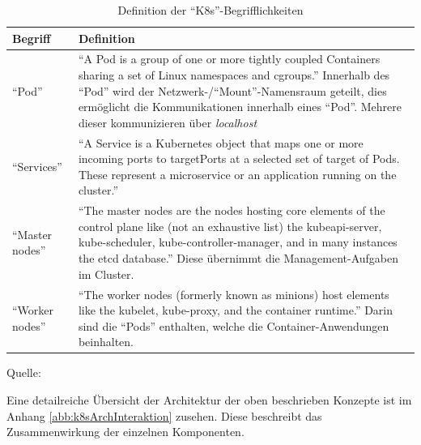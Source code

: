 \begin{table}[h!]
	\centering
	
	\begin{tabular}{@{}lp{12.0cm}@{}}\toprule[1.5pt]
		
		\textbf{Begriff} & \textbf{Definition}  \\ \midrule
		
		\enquote{Pod} & \enquote{A Pod is a group of one or more tightly coupled Containers sharing a set of Linux namespaces and cgroups.} Innerhalb des \enquote{Pod} wird der Netzwerk-/\enquote{Mount}-Namensraum geteilt, dies ermöglicht die Kommunikationen innerhalb eines \enquote{Pod}. Mehrere dieser kommunizieren über \textit{localhost} \\
		
		\enquote{Services} &  \enquote{A Service is a Kubernetes object that maps one or more incoming ports to targetPorts at a selected set of target of Pods. These represent a microservice or an application running on the cluster.} \\
		
		\enquote{Master nodes} & \enquote{The master nodes are the nodes hosting core elements of the control plane like (not an exhaustive list) the kubeapi-server, kube-scheduler, kube-controller-manager, and in many	instances the etcd database.} Diese übernimmt die Management-Aufgaben im Cluster. \\
		
		\enquote{Worker nodes} & \enquote{The worker nodes (formerly known as minions) host elements like the kubelet, kube-proxy, and the container runtime.} Darin sind die \enquote{Pods} enthalten, welche die Container-Anwendungen beinhalten. \\
		
		\bottomrule[1.5pt]
	\end{tabular}
	
	\caption{Definition der \enquote{\ac{K8s}}-Begrifflichkeiten}
	{\footnotesize{Quelle: \cite[][S.10-14]{caban_architecting_2019}}}
	\label{tab:definitionen}
	
\end{table}
Eine detailreiche Übersicht der Architektur der oben beschrieben Konzepte ist im Anhang \vref{abb:k8sArchInteraktion} zusehen. Diese beschreibt das Zusammenwirkung der einzelnen Komponenten.

